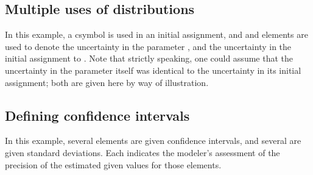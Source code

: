 \documentclass[draftspec]{sbmlpkgspec}
\newcommand{\mathml}{MathML\xspace}
\newcommand{\controversial}{\marginpar{\hspace*{34pt}\raisebox{-0.5ex}{\Large?}}}
\begin{document}







\subsection{Multiple uses of distributions }

In this example, a  csymbol is used in an initial assignment, and  and  elements are used to denote the uncertainty in the parameter , and the uncertainty in the initial assignment to .  Note that strictly speaking, one could assume that the uncertainty in the parameter itself was identical to the uncertainty in its initial assignment; both are given here by way of illustration.



\subsection{Defining confidence intervals }

In this example, several \Parameter elements are given confidence intervals, and several \Species are given standard deviations.  Each indicates the modeler's assessment of the precision of the estimated given values for those elements.  
\end{document}
